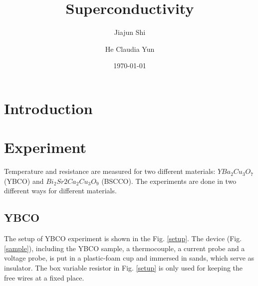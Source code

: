 \documentclass[prb,preprint]{revtex4-1}
\begin{document}
\title{Superconductivity}

\author{Jiajun Shi}
\author{He Claudia Yun}


\date{\today}


\begin{abstract}

\end{abstract}

\maketitle 

\section{Introduction}

\section{Experiment}
Temperature and resistance are measured for two different materials: $YBa_{2}Cu_{3}O_{7}$ (YBCO) and $Bi_{2}Sr{2}Ca_{2}Cu_{3}O_{9}$ (BSCCO). The experiments are done in two different ways for different materials.\\
\subsection{YBCO}
The setup of YBCO experiment is shown in the Fig. \ref{setup}. The device (Fig. \ref{sample}), including the YBCO sample, a thermocouple, a current probe and a voltage probe, is put in a plastic-foam cup and immersed in sands, which serve as insulator. The box variable resistor in Fig. \ref{setup} is only used for keeping the free wires at a fixed place. \\
\end{document}
